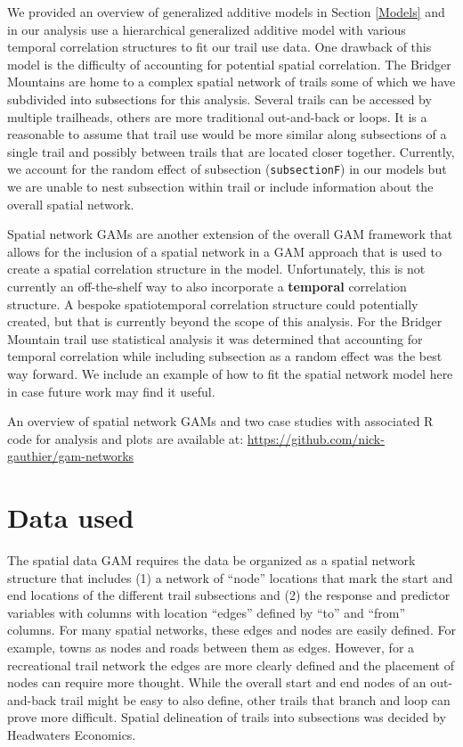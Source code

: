 \documentclass[
]{book}
\begin{document}
We provided an overview of generalized additive models in Section \ref{Models} and in our analysis use a hierarchical generalized additive model with various temporal correlation structures to fit our trail use data. One drawback of this model is the difficulty of accounting for potential spatial correlation. The Bridger Mountains are home to a complex spatial network of trails some of which we have subdivided into subsections for this analysis. Several trails can be accessed by multiple trailheads, others are more traditional out-and-back or loops. It is a reasonable to assume that trail use would be more similar along subsections of a single trail and possibly between trails that are located closer together. Currently, we account for the random effect of subsection (\texttt{subsectionF}) in our models but we are unable to nest subsection within trail or include information about the overall spatial network.

Spatial network GAMs are another extension of the overall GAM framework that allows for the inclusion of a spatial network in a GAM approach that is used to create a spatial correlation structure in the model. Unfortunately, this is not currently an off-the-shelf way to also incorporate a \textbf{temporal} correlation structure. A bespoke spatiotemporal correlation structure could potentially created, but that is currently beyond the scope of this analysis. For the Bridger Mountain trail use statistical analysis it was determined that accounting for temporal correlation while including subsection as a random effect was the best way forward. We include an example of how to fit the spatial network model here in case future work may find it useful.

An overview of spatial network GAMs and two case studies with associated R code for analysis and plots are available at: \url{https://github.com/nick-gauthier/gam-networks}

\hypertarget{data-used-2}{%
\section{Data used}\label{data-used-2}}

The spatial data GAM requires the data be organized as a spatial network structure that includes (1) a network of ``node'' locations that mark the start and end locations of the different trail subsections and (2) the response and predictor variables with columns with location ``edges'' defined by ``to'' and ``from'' columns. For many spatial networks, these edges and nodes are easily defined. For example, towns as nodes and roads between them as edges. However, for a recreational trail network the edges are more clearly defined and the placement of nodes can require more thought. While the overall start and end nodes of an out-and-back trail might be easy to also define, other trails that branch and loop can prove more difficult. Spatial delineation of trails into subsections was decided by Headwaters Economics.
\end{document}
